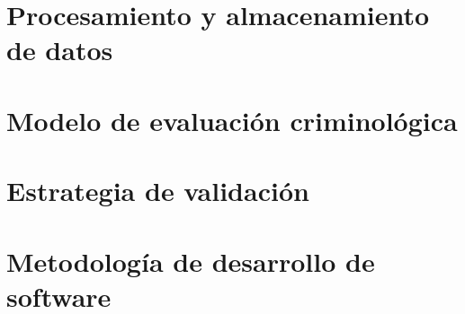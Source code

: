 \section{Procesamiento y almacenamiento de datos}
\label{sec:procesamiento_datos}


\section{Modelo de evaluación criminológica}
\label{sec:modelo_criminologico}


\section{Estrategia de validación}
\label{sec:estrategia_validacion}


\section{Metodología de desarrollo de software}
\label{sec:metodologia_software}

